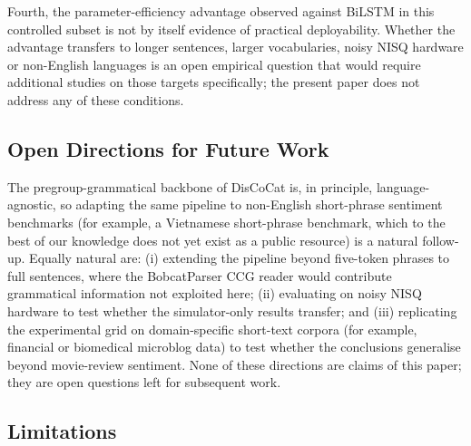 \documentclass[11pt, a4paper]{article}
\begin{document}
Fourth, the parameter-efficiency advantage observed against BiLSTM
in this controlled subset is not by itself evidence of practical
deployability. Whether the advantage transfers to longer sentences,
larger vocabularies, noisy NISQ hardware or non-English languages
is an open empirical question that would require additional studies
on those targets specifically; the present paper does not address
any of these conditions.

\subsection{Open Directions for Future Work}

The pregroup-grammatical backbone of DisCoCat is, in principle,
language-agnostic, so adapting the same pipeline to non-English
short-phrase sentiment benchmarks (for example, a Vietnamese
short-phrase benchmark, which to the best of our knowledge does not
yet exist as a public resource) is a natural follow-up. Equally
natural are: (i) extending the pipeline beyond five-token phrases
to full sentences, where the BobcatParser CCG reader would
contribute grammatical information not exploited here; (ii)
evaluating on noisy NISQ hardware to test whether the simulator-only
results transfer; and (iii) replicating the experimental grid on
domain-specific short-text corpora (for example, financial or
biomedical microblog data) to test whether the conclusions
generalise beyond movie-review sentiment. None of these directions
are claims of this paper; they are open questions left for
subsequent work.

\subsection{Limitations}
\end{document}

